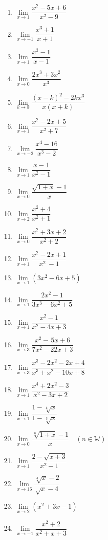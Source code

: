 \documentclass{report}
\begin{document}
\begin{multicols}{2}
\begin{enumerate}
            \item $\lim\limits_{x\to1}{\dfrac{x^{2}-5x+6}{x^{2}-9}}$
            \item $\lim\limits_{x\to-1}{\dfrac{x^{3}+1}{x+1}}$
            \item $\lim\limits_{x\to1}{\dfrac{x^{3}-1}{x-1}}$
            \item $\lim\limits_{x\to0}{\dfrac{2x^{3}+3x^{2}}{x^{3}}}$
            \item $\lim\limits_{k\to0}{\dfrac{{(x-k)}^{2}-2k x^{3}}{x(x+k)}}$
            \item $\lim\limits_{x\to1}{\dfrac{x^{2}-2x+5}{x^{2}+7}}$
            \item $\lim\limits_{x\to-2}{\dfrac{x^{4}-16}{x^{3}-2}}$
            \item $\lim\limits_{x\to1}{\dfrac{x-1}{x^{2}-1}}$
            \item $\lim\limits_{x\to0}{\dfrac{{\sqrt{1+x}}-1}{x}}$
            \item $\lim\limits_{x\to2}{\dfrac{x^{2}+4}{x^{2}+1}}$
            \item $\lim\limits_{x\to0}{\dfrac{x^{2}+3x+2}{x^{2}+2}}$
            \item $\lim\limits_{x\to1}{\dfrac{x^{2}-2x+1}{x^{2}\ -1}}$
            \item $\lim\limits_{x\to1{}}(3x^{2}-6x+5)$
            \item $\lim\limits_{x\to1}{\dfrac{2x^{2}-1}{3x^{3}-6x^{2}+5}}$
            \item $\lim\limits_{x\to1}{\dfrac{x^{2}-1}{x^{2}-4x+3}}$
            \item $\lim\limits_{x\to3}{\dfrac{x^{2}-\,5x+6}{7x^{2}-22x+3}}$
            \item $\lim\limits_{x\to3}{\dfrac{x^{3}-2x^{2}-2x+4}{x^{3}+x^{2}-10x+8}}$
            \item $\lim\limits_{x\to1}{\dfrac{x^{4}+2x^{2}-3}{x^{2}-3x+2}}$
            \item $\lim\limits_{x\to1}{\dfrac{1-{\sqrt[4]{x}}}{1-{\sqrt[3]{x}}}}$
            \item $\lim\limits_{x\to0}{\dfrac{\sqrt[n]{1+x}-1}{x}} \quad (n \in \mathbb{W})$
            \item $\lim\limits_{x\to1}{\dfrac{2-{\sqrt{x+3}}}{x^{2}-1}}$
            \item $\lim\limits_{x\to16}{\dfrac{\sqrt[4]{x}-2}{\sqrt{x}-4}}$
            \item $\lim\limits_{x\to2}(x^{2}+3x-1)$
            \item $\lim\limits_{x\to{-1}}{\dfrac{x^{2}+2}{x^{2}+x+3}}$

\end{enumerate}
\end{multicols}
\end{document}
